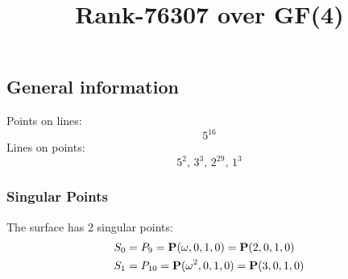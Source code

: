 \documentclass{article}
\newcommand\setTBstruts{\def\T{\rule{0pt}{2.6ex}}%
\def\B{\rule[-1.2ex]{0pt}{0pt}}}
\newcommand{\bP}{{\bf P}}
\begin{document}
 
\setTBstruts



{\allowdisplaybreaks%






\title{Rank-76307 over GF(4)}
\author{}%
\maketitle%
%
{}



\subsection*{General information}
Points on lines:
$$
5^{16}$$
Lines on points:
$$
5^2,\,3^3,\,2^{29},\,1^3$$
\subsubsection*{Singular Points}
The surface has 2 singular points:\\
\begin{align*}
S_{0} &= P_{9}=\bP(\omega , 0, 1, 0) = \bP(2, 0, 1, 0)\\
S_{1} &= P_{10}=\bP(\omega^{2}, 0, 1, 0) = \bP(3, 0, 1, 0)\\
\end{align*}
}
\end{document}
